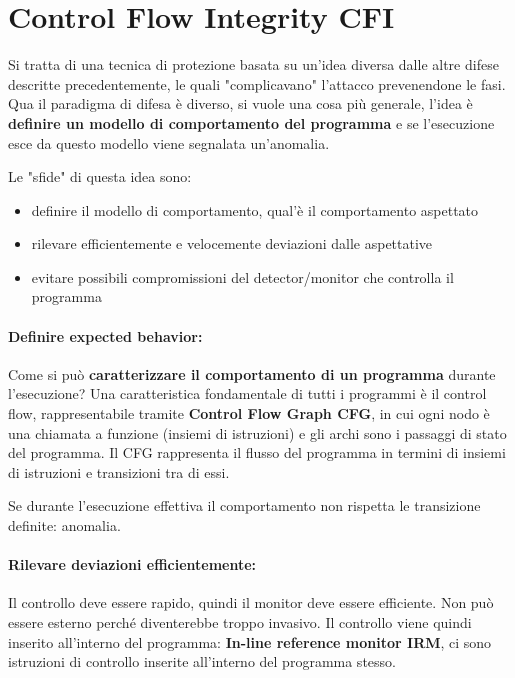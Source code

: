 \section{Control Flow Integrity CFI}
\label{sec:cfi}

Si tratta di una tecnica di protezione basata su un'idea diversa dalle altre difese descritte precedentemente, le quali "complicavano" l'attacco prevenendone le fasi. Qua il paradigma di difesa è diverso, si vuole una cosa più generale, l'idea è \textbf{definire un modello di comportamento del programma} e se l'esecuzione esce da questo modello viene segnalata un'anomalia.

Le "sfide" di questa idea sono: 
\begin{itemize}
	\item definire il modello di comportamento, qual'è il comportamento aspettato
	\item rilevare efficientemente e velocemente deviazioni dalle aspettative
	\item evitare possibili compromissioni del detector/monitor che controlla il programma
\end{itemize}

\paragraph{Definire expected behavior:} Come si può \textbf{caratterizzare il comportamento di un programma} durante l'esecuzione? Una caratteristica fondamentale di tutti i programmi è il control flow, rappresentabile tramite \textbf{Control Flow Graph CFG}, in cui ogni nodo è una chiamata a funzione (insiemi di istruzioni) e gli archi sono i passaggi di stato del programma. Il CFG rappresenta il flusso del programma in termini di insiemi di istruzioni e transizioni tra di essi. 

Se durante l'esecuzione effettiva il comportamento non rispetta le transizione definite: anomalia.

\paragraph{Rilevare deviazioni efficientemente:} Il controllo deve essere rapido, quindi il monitor deve essere efficiente. Non può essere esterno perché diventerebbe troppo invasivo. Il controllo viene quindi inserito all'interno del programma: \textbf{In-line reference monitor IRM}, ci sono istruzioni di controllo inserite all'interno del programma stesso. 

